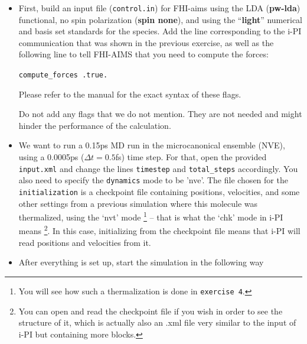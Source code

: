 \documentclass[a4paper,11pt]{scrartcl}
\begin{document}
\begin{itemize} 
\item First, build an input file (\texttt{control.in}) for FHI-aims using the LDA (\textbf{pw-lda}) functional, no spin polarization (\textbf{spin none}), and using the ``\textbf{light}'' numerical and basis set standards for the species. 
Add the line corresponding to the i-PI communication that was shown in the previous exercise, as well as the following line to tell FHI-AIMS that you need to compute the forces:
\begin{center}

\texttt{compute\_forces .true.}
\end{center}
Please refer to the manual for the exact syntax of these flags.  

Do not add any flags that we do not mention. They are not needed and might hinder the performance of the calculation. 

\item We want to run a 0.15ps MD run in the microcanonical ensemble (NVE), using a 0.0005ps ($\Delta t = 0.5$fs) time step. 
For that, open the provided \texttt{input.xml} and change the lines \texttt{timestep} and \texttt{total\_steps}  accordingly. 
You also need to specify the \texttt{dynamics} mode to be 'nve'.
The file chosen for the \texttt{initialization} is a checkpoint file containing positions, velocities, and
some other settings from a previous
simulation where this molecule was thermalized, using the `nvt' mode \footnote{You will see how such a thermalization is done in \texttt{exercise 4}.} -- that is what the  `chk'  mode in i-PI means \footnote{You can open and read the checkpoint file if you wish in order to see the structure of it, which is actually also an .xml file very similar to the input of i-PI but containing more blocks.}.  
In this case, initializing from the checkpoint file means that i-PI will read positions and velocities from it.  


\item After everything is set up, start the simulation in the following way


\vspace{0.3cm}
\colorbox{Peach}{}
\end{itemize}
\end{document}
